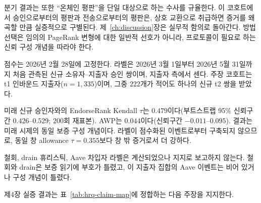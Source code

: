 분기 결과는 또한 ``온체인 평판''을 단일 대상으로 하는 수사를 규율한다. 이 코호트에서 승인으로부터의 평판과 전송으로부터의 평판은, 상호 교환으로 취급하면 증거를 왜곡할 만큼 실증적으로 구별된다. 제~\ref{ch:discussion}장은 실무적 함의로 돌아간다. 방법 선택은 임의의 PageRank 변형에 대한 일반적 선호가 아니라, 프로토콜이 필요로 하는 신뢰 구성 개념을 따라야 한다.


점수는 2026년 2월 28일에 고정한다. 라벨은 2026년 3월 1일부터 2026년 5월 31일까지 처음 관측된 신규 소유자--지출자 승인 쌍이며, 지출자 측에서 센다. 주장 코호트는 t1 인바운드 지출자($n=1{,}335$)이며, 그중 $222$개가 적어도 하나의 신규 t2 쌍을 받았다.

미래 신규 승인자와의 EndorseRank Kendall $\tau$는 $0.479$이다(부트스트랩 95\% 신뢰구간 $0.426$--$0.529$; $200$회 재표본). AWP는 $0.044$이다(신뢰구간 $-0.011$--$0.095$). 결과는 미래 시제의 동일 보증 구성 개념이다. 라벨이 점수화된 이벤트로부터 구축되지 않으므로, 동일 창 allowance $\tau=0.355$보다 창 밖 증거로서 더 강하다.

철회, drain 휴리스틱, Aave 차입자 라벨은 계산되었으나 지지로 보고하지 않는다. 철회와 drain은 보증 읽기에 부호가 틀렸고, 이 지출자 집합의 Aave 이벤트는 비어 있거나 구성 개념이 틀렸다.


제4장 실증 결과는 표~\ref{tab:hrq-claim-map}에 정합하는 다음 주장을 지지한다.

